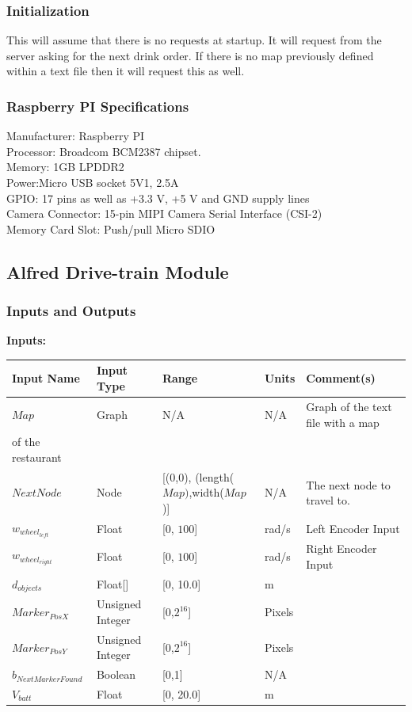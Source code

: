 \documentclass [10pt]{article}
\begin{document}
\subsubsection{Initialization}
This will assume that there is no requests at startup. It will request from the server asking for the next drink order. If there is no map previously defined within a text file then it will request this as well.

\subsubsection{Raspberry PI Specifications}
Manufacturer: Raspberry PI \\
Processor: Broadcom BCM2387 chipset. \\
Memory: 1GB LPDDR2\\
Power:Micro USB socket 5V1, 2.5A\\
GPIO: 17 pins as well as +3.3 V, +5 V and GND supply lines\\
Camera Connector: 15-pin MIPI Camera Serial Interface (CSI-2)\\
Memory Card Slot: Push/pull Micro SDIO\\

\subsection{Alfred Drive-train Module}

\subsubsection{Inputs and Outputs}

\textbf{Inputs: } 


\begin{longtable}{|l|l|l|l|l|}\hline 
	\rowcolor{tableCell}Input Name & Input Type & Range & Units & Comment(s) \\ \hline
	$ Map $ & Graph & N/A & N/A & Graph of the text file with a map \\ of the restaurant \\ \hline
	$ NextNode $ & Node & [(0,0), (length($Map)$,width($Map$)] & N/A & The next node to travel to. \\ \hline
	$ w_{wheel_{left}} $ & Float & [0, $ 100 $]& rad/s &  Left Encoder Input\\ \hline
	$ w_{wheel_{right}} $ & Float & [0, $ 100 $]& rad/s & Right Encoder Input  \\ \hline
	$  d_{objects} $ & Float[] & [0, 10.0]& m &  \\ \hline
	$ Marker_{PosX} $ & Unsigned Integer & [0,$2^{16}$] & Pixels &  \\ \hline
	$ Marker_{PosY} $ & Unsigned Integer & [0,$2^{16}$] & Pixels & \\ \hline
	$ b_{NextMarkerFound} $ & Boolean & [0,1] & N/A & \\ \hline
	$  V_{batt} $ & Float & [0, 20.0]& m &  \\ \hline
\end{longtable}
\end{document}
